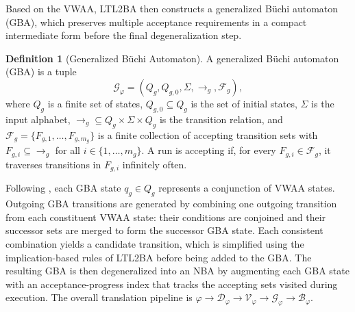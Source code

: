 \documentclass[lettersize,journal]{IEEEtran}
\theoremstyle{italiclemma}
\theoremstyle{italiclemma}
\theoremstyle{definition}
\newtheorem{definition}{Definition}
\begin{document}
Based on the VWAA, LTL2BA then constructs a generalized Büchi automaton (GBA), which preserves multiple acceptance requirements in a compact intermediate form before the final degeneralization step.

\begin{definition}[Generalized Büchi Automaton]
A generalized Büchi automaton (GBA) is a tuple
\[
\mathcal{G}_\varphi=(Q_g,Q_{g,0},\Sigma,\rightarrow_g,\mathcal{F}_g),
\]
where $Q_g$ is a finite set of states, $Q_{g,0} \subseteq Q_g$ is the set of initial states, $\Sigma$ is the input alphabet, $\rightarrow_g \subseteq Q_g \times \Sigma \times Q_g$ is the transition relation, and
$\mathcal{F}_g=\{F_{g,1},\dots,F_{g,m_g}\}$
is a finite collection of accepting transition sets with $F_{g,i} \subseteq \rightarrow_g$ for all $i \in \{1,\dots,m_g\}$. A run is accepting if, for every $F_{g,i} \in \mathcal{F}_g$, it traverses transitions in $F_{g,i}$ infinitely often.
\end{definition}

Following \cite{Gastin2001FastLT}, each GBA state \(q_g \in Q_g \) represents a conjunction of VWAA states. Outgoing GBA transitions are generated by combining one outgoing transition from each constituent VWAA state: their conditions are conjoined and their successor sets are merged to form the successor GBA state. Each consistent combination yields a candidate transition, which is simplified using the implication-based rules of LTL2BA before being added to the GBA. The resulting GBA is then degeneralized into an NBA by augmenting each GBA state with an acceptance-progress index that tracks the accepting sets visited during execution. The overall translation pipeline is $ \varphi \rightarrow \mathcal{D}_\varphi \rightarrow \mathcal{V}_\varphi
\rightarrow \mathcal{G}_\varphi \rightarrow \mathcal{B}_\varphi. $

\end{document}
